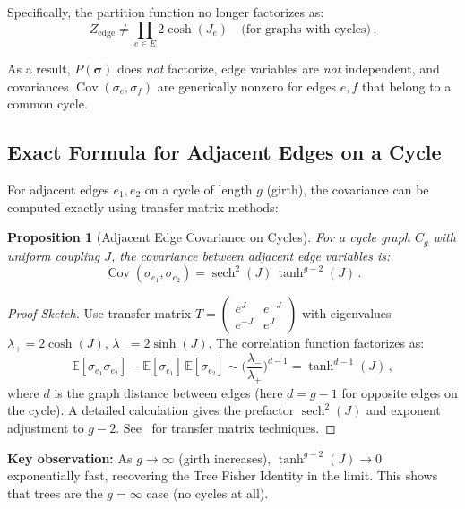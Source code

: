 \documentclass[11pt]{article}
\newtheorem{proposition}[theorem]{Proposition}
\theoremstyle{definition}
\theoremstyle{remark}
\begin{document}
Specifically, the partition function no longer factorizes as:
\begin{equation}
Z_{\text{edge}} \neq \prod_{e \in E} 2\cosh(J_e)
\quad \text{(for graphs with cycles)}\,.
\end{equation}

As a result, $P(\boldsymbol{\sigma})$ does \emph{not} factorize, edge
variables are \emph{not} independent, and covariances
$\operatorname{Cov}(\sigma_e, \sigma_f)$ are generically nonzero for edges
$e, f$ that belong to a common cycle.

\subsection{Exact Formula for Adjacent Edges on a Cycle}

For adjacent edges $e_1, e_2$ on a cycle of length $g$ (girth), the
covariance can be computed exactly using transfer matrix methods:

\begin{proposition}[Adjacent Edge Covariance on Cycles]
\label{prop:adjacent-edge-cycle}
For a cycle graph $C_g$ with uniform coupling $J$, the covariance between
adjacent edge variables is:
\begin{equation}
\label{eq:adjacent-edge-cycle}
\operatorname{Cov}(\sigma_{e_1}, \sigma_{e_2})
= \operatorname{sech}^2(J)\, \tanh^{g-2}(J)\,.
\end{equation}
\end{proposition}

\begin{proof}[Proof Sketch]
Use transfer matrix $T = \begin{pmatrix} e^J & e^{-J} \\ e^{-J} & e^J \end{pmatrix}$
with eigenvalues $\lambda_+ = 2\cosh(J)$, $\lambda_- = 2\sinh(J)$.
The correlation function factorizes as:
\begin{equation}
\mathbb{E}[\sigma_{e_1} \sigma_{e_2}]
- \mathbb{E}[\sigma_{e_1}]\,\mathbb{E}[\sigma_{e_2}]
\sim \biggl(\frac{\lambda_-}{\lambda_+}\biggr)^{d-1}
= \tanh^{d-1}(J)\,,
\end{equation}
where $d$ is the graph distance between edges (here $d = g - 1$ for
opposite edges on the cycle). A detailed calculation gives the prefactor
$\operatorname{sech}^2(J)$ and exponent adjustment to $g - 2$.
See~\cite{Baxter2016} for transfer matrix techniques.
\end{proof}

\textbf{Key observation:} As $g \to \infty$ (girth increases),
$\tanh^{g-2}(J) \to 0$ exponentially fast, recovering the Tree Fisher
Identity in the limit. This shows that trees are the $g = \infty$ case
(no cycles at all).
\end{document}
